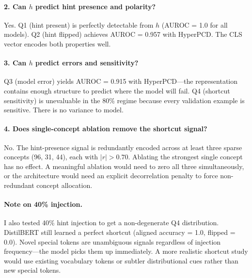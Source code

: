 \documentclass{article}
\begin{document}
\paragraph{2. Can $h$ predict hint presence and polarity?} Yes. Q1 (hint present) is perfectly detectable from $h$ (AUROC = 1.0 for all models). Q2 (hint flipped) achieves AUROC = 0.957 with HyperPCD. The CLS vector encodes both properties well.

\paragraph{3. Can $h$ predict errors and sensitivity?} Q3 (model error) yields AUROC = 0.915 with HyperPCD---the representation contains enough structure to predict where the model will fail. Q4 (shortcut sensitivity) is unevaluable in the 80\% regime because every validation example is sensitive. There is no variance to model.

\paragraph{4. Does single-concept ablation remove the shortcut signal?} No. The hint-presence signal is redundantly encoded across at least three sparse concepts (96, 31, 44), each with $|r| > 0.70$. Ablating the strongest single concept has no effect. A meaningful ablation would need to zero all three simultaneously, or the architecture would need an explicit decorrelation penalty to force non-redundant concept allocation.

\paragraph{Note on 40\% injection.} I also tested 40\% hint injection to get a non-degenerate Q4 distribution. DistilBERT still learned a perfect shortcut (aligned accuracy = 1.0, flipped = 0.0). Novel special tokens are unambiguous signals regardless of injection frequency---the model picks them up immediately. A more realistic shortcut study would use existing vocabulary tokens or subtler distributional cues rather than new special tokens.
\end{document}

